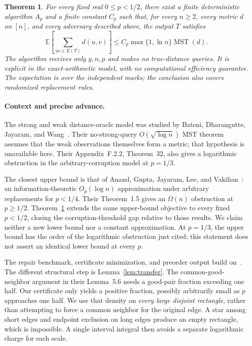 \documentclass[acmlarge,screen,nonacm,11pt]{acmart}
\newtheorem{theorem}{Theorem}[section]
\newcommand{\MST}{\operatorname{MST}}
\newcommand{\E}{\mathbb{E}}
\begin{document}
\begin{theorem}\label{thm:main}
For every fixed real $0\leq p<1/2$, there exist a finite deterministic algorithm $A_p$ and a finite constant $C_p$ such that, for every $n\geq2$, every metric $d$ on $[n]$, and every adversary described above, the output $T$ satisfies
\[
 \E\!\left[\sum_{uv\in E(T)}d(u,v)\right]
 \leq C_p\max\{1,\ln n\}\MST(d).
\]
The algorithm receives only $y,n,p$ and makes no true-distance queries. It is explicit in the exact-arithmetic model, with no computational efficiency guarantee. The expectation is over the independent marks; the conclusion also covers randomized replacement rules.
\end{theorem}

\paragraph{Context and precise advance.}
The strong and weak distance-oracle model was studied by Bateni, Dharangutte, Jayaram, and Wang~\cite{BDJW24}. Their no-strong-query $O(\sqrt{\log n})$ MST theorem assumes that the weak observations themselves form a metric; that hypothesis is unavailable here. Their Appendix~F.2.2, Theorem~32, also gives a logarithmic obstruction in the arbitrary-corruption model at $p=1/3$.

The closest upper bound is that of Anand, Gupta, Jayaram, Lee, and Vakilian~\cite[Theorems~1.4 and~5.3]{AGJLV26}: an information-theoretic $O_p(\log n)$ approximation under arbitrary replacements for $p<1/4$. Their Theorem~1.5 gives an $\Omega(n)$ obstruction at $p\geq1/2$. Theorem~\ref{thm:main} extends the same upper-bound objective to every fixed $p<1/2$, closing the corruption-threshold gap relative to those results. We claim neither a new lower bound nor a constant approximation. At $p=1/3$, the upper bound has the order of the logarithmic obstruction just cited; this statement does not assert an identical lower bound at every $p$.

The repair benchmark, certificate minimization, and preorder output build on~\cite[Lemma~3.2 and Section~5]{AGJLV26}. The different structural step is Lemma~\ref{lem:transfer}. The common-good-neighbor argument in their Lemma~5.6 needs a good-pair fraction exceeding one half. Our certificate only yields a positive fraction, possibly arbitrarily small as $p$ approaches one half. We use that density on \emph{every large disjoint rectangle}, rather than attempting to force a common neighbor for the original edge. A star among short edges and endpoint exclusion on long edges produce an empty rectangle, which is impossible. A single interval integral then avoids a separate logarithmic charge for each scale.
\end{document}
